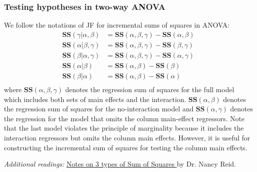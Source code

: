 \subsubsection*{Testing hypotheses in two-way ANOVA}
We follow the notations of JF for incremental sums of squares in ANOVA:
$$
\begin{aligned}
	\textbf{SS}(\gamma | \alpha, \beta) &= \textbf{SS}(\alpha, \beta, \gamma) - \textbf{SS}(\alpha, \beta)\\
	\textbf{SS}(\alpha |  \beta, \gamma) &= \textbf{SS}(\alpha, \beta, \gamma) - \textbf{SS}(\beta, \gamma)\\
	\textbf{SS}(\beta |  \alpha, \gamma) &= \textbf{SS}(\alpha, \beta, \gamma) - \textbf{SS}(\alpha, \gamma)\\
	\textbf{SS}(\alpha | \beta) &= \textbf{SS}(\alpha, \beta) - \textbf{SS}(\beta)\\
	\textbf{SS}(\beta |  \alpha) &=\textbf{SS}(\alpha, \beta) - \textbf{SS}(\alpha)\\
\end{aligned}
$$
where $\textbf{SS}(\alpha, \beta, \gamma)$ denotes the regression sum of squares for the full model which includes both sets of main effects and the interaction. $\textbf{SS}(\alpha, \beta)$ denotes the regression sum of squares for the no-interaction model and $\textbf{SS}(\alpha, \gamma)$ denotes the regression for the model that omits the column main-effect regressors.
Note that the last model violates the principle of marginality because it includes the interaction regressors but omits the column main effects.
However, it is useful for constructing the incremental sum of squares for testing the column main effects.

{\it Additional readings: } \href{http://www.utstat.utoronto.ca/reid/sta442f/2009/typeSS.pdf}{Notes on 3 types of Sum of Squares }by Dr. Nancy Reid.

